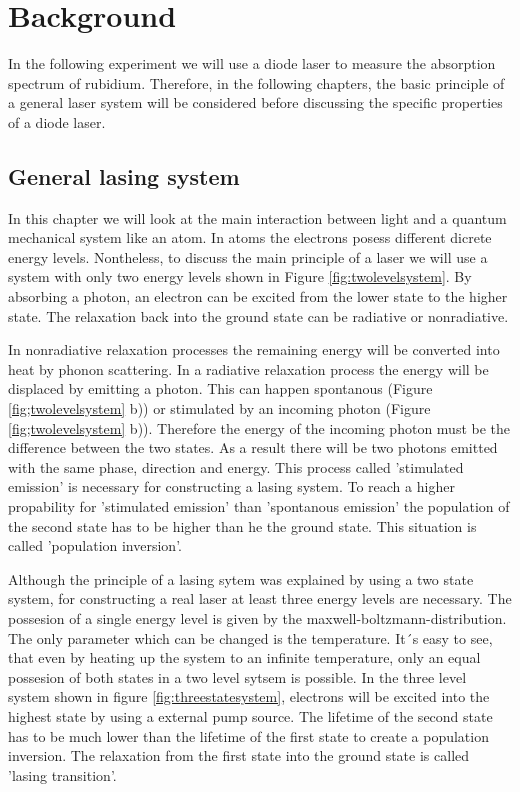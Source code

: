 \section{Background}

In the following experiment we will use a diode laser to measure the absorption
spectrum of rubidium. Therefore, in the following chapters, the basic principle
of a general laser system will be considered before discussing the specific
properties of a diode laser.

\subsection{General lasing system}

In this chapter we will look at the main interaction between light and a
quantum mechanical system like an atom. In atoms the electrons posess different
dicrete energy levels. Nontheless, to discuss the main principle of a laser
we will use a system with only two energy levels shown in Figure \ref{fig:twolevelsystem}.
By absorbing a photon, an electron can be excited from the lower state to the
higher state. The relaxation back into the ground state can be radiative or
nonradiative.

In nonradiative relaxation processes the remaining energy will be converted into
heat by phonon scattering. In a radiative relaxation process the energy will
be displaced by emitting a photon. This can happen spontanous (Figure \ref{fig;twolevelsystem} b))
or stimulated by an incoming photon (Figure \ref{fig;twolevelsystem} b)).
Therefore the energy of the incoming photon must be the difference between the
two states. As a result there will be two photons emitted with the same phase,
direction and energy. This process called 'stimulated emission' is necessary
for constructing a lasing system. To reach a higher propability for 'stimulated emission'
than 'spontanous emission' the population of the second state has to be higher
than he the ground state. This situation is called 'population inversion'.

Although the principle of a lasing sytem was explained by using a two state system,
for constructing a real laser at least three energy levels are necessary. The possesion
of a single energy level is given by the maxwell-boltzmann-distribution. The only
parameter which can be changed is the temperature. It´s easy to see, that even
by heating up the system to an infinite temperature, only an equal possesion
of both states in a two level sytsem is possible. In the three level system
shown in figure \ref{fig:threestatesystem},
electrons will be excited into the highest state by using a external pump source.
The lifetime of the second state has to be much lower than the lifetime of the
first state to create a population inversion. The relaxation from the first state
into the ground state is called 'lasing transition'.

